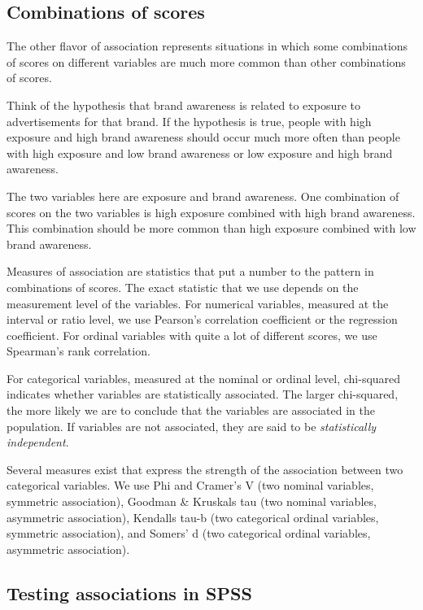 \documentclass[a4paper]{book}
\theoremstyle{definition}
\theoremstyle{definition}
\theoremstyle{definition}
\theoremstyle{remark}
\begin{document}
\subsection*{Combinations of scores}\label{combinations-of-scores}

The other flavor of association represents situations in which some
combinations of scores on different variables are much more common than
other combinations of scores.

Think of the hypothesis that brand awareness is related to exposure to
advertisements for that brand. If the hypothesis is true, people with
high exposure and high brand awareness should occur much more often than
people with high exposure and low brand awareness or low exposure and
high brand awareness.

The two variables here are exposure and brand awareness. One combination
of scores on the two variables is high exposure combined with high brand
awareness. This combination should be more common than high exposure
combined with low brand awareness.

Measures of association are statistics that put a number to the pattern
in combinations of scores. The exact statistic that we use depends on
the measurement level of the variables. For numerical variables,
measured at the interval or ratio level, we use Pearson's correlation
coefficient or the regression coefficient. For ordinal variables with
quite a lot of different scores, we use Spearman's rank correlation.

For categorical variables, measured at the nominal or ordinal level,
chi-squared indicates whether variables are statistically associated.
The larger chi-squared, the more likely we are to conclude that the
variables are associated in the population. If variables are not
associated, they are said to be \emph{statistically independent}.

Several measures exist that express the strength of the association
between two categorical variables. We use Phi and Cramer's V (two
nominal variables, symmetric association), Goodman \& Kruskals tau (two
nominal variables, asymmetric association), Kendalls tau-b (two
categorical ordinal variables, symmetric association), and Somers' d
(two categorical ordinal variables, asymmetric association).

\subsection*{Testing associations in
SPSS}\label{testing-associations-in-spss}
\end{document}
